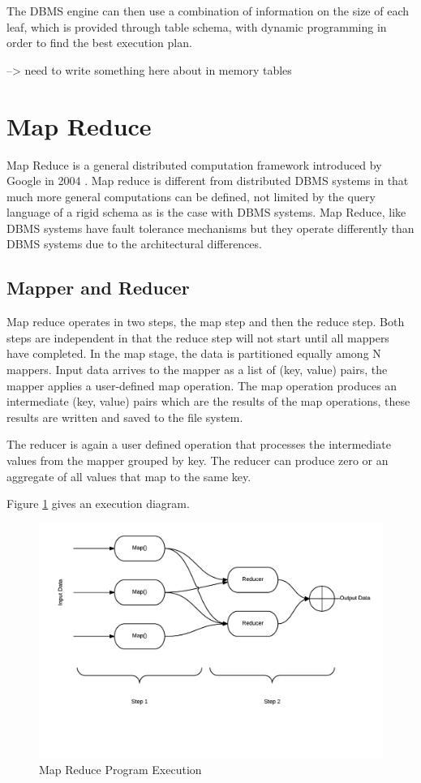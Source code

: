 \documentclass[10pt,twocolumn]{IEEEtran11}
\begin{document}
The DBMS engine can then use a combination of information on the size of each leaf, which is provided through table schema, with dynamic programming in order to find the best execution plan.
\par
--> need to write something here about in memory tables

\section {Map Reduce}

Map Reduce is a general distributed computation framework introduced by Google in 2004 \cite{dean2001mapreduce}.  Map reduce is different from distributed DBMS systems in that much more general computations can be defined, not limited by the query language of a rigid schema as is the case with DBMS systems.  Map Reduce, like DBMS systems have fault tolerance mechanisms but they operate differently than DBMS systems due to the architectural differences. 

\subsection{Mapper and Reducer}
Map reduce operates in two steps, the map step and then the reduce step.  Both steps are independent in that the reduce step will not start until all mappers have completed.
In the map stage, the data is partitioned equally among N mappers.  Input data arrives to the mapper as a list of (key, value) pairs, the mapper applies a user-defined map operation.
The map operation produces an intermediate (key, value) pairs which are the results of the map operations, these results are written and saved to the file system.  
\par
The reducer is again a user defined operation that processes the intermediate values from the mapper grouped by key.  The reducer can produce zero or an aggregate of all values
that map to the same key.

Figure \ref{fig:mapReduce} gives an execution diagram.
\begin{figure}[h]
\centering
\includegraphics[scale=0.50]{images/mapReduce.png}
\caption{Map Reduce Program Execution}
\label{fig:mapReduce}
\end{figure}
\end{document}

